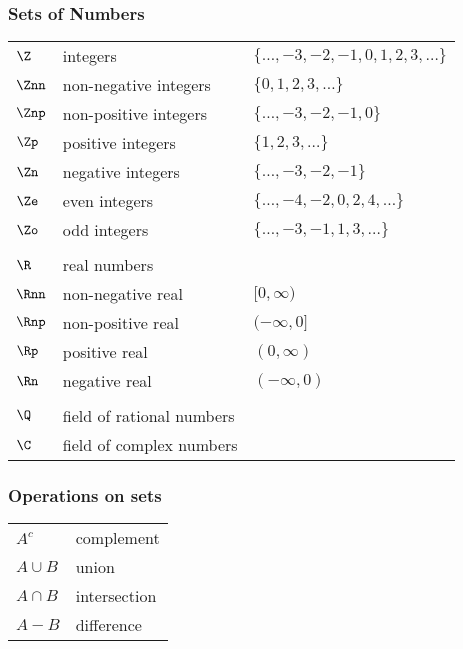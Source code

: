 \subsubsection*{Sets of Numbers}
\begin{tabular}{lll}
$\Z$       & integers              & $\{\ldots,-3,-2,-1,0,1,2,3,\ldots\}$ \\
$\Znn$     & non-negative integers & $\{0,1,2,3,\ldots\}$ \\
$\Znp$     & non-positive integers & $\{\ldots,-3,-2,-1,0\}$ \\
$\Zp$      & positive integers     & $\{1,2,3,\ldots\}$ \\
$\Zn$      & negative integers     & $\{\ldots,-3,-2,-1\}$ \\
$\Ze$      & even integers         & $\{\ldots,-4,-2,0,2,4,\ldots\}$ \\
$\Zo$      & odd  integers         & $\{\ldots,-3,-1,1,3,\ldots\}$ \\
\\
$\R$       & real numbers          &               \\
$\Rnn$     & non-negative real     & $[0,\infty)$  \\
$\Rnp$     & non-positive real     & $(-\infty,0]$ \\
$\Rp$      & positive real         & $(0,\infty)$  \\
$\Rn$      & negative real         & $(-\infty,0)$ \\
\\
$\Q$       & field of rational numbers \\        
$\C$       & field of complex numbers          
\end{tabular}

\subsubsection*{Operations on sets}
\begin{tabular}{ll}
   $A^c     $ & complement   \\
   $A \cup B$ & union        \\
   $A \cap B$ & intersection \\
   $A -    B$ & difference
\end{tabular}

